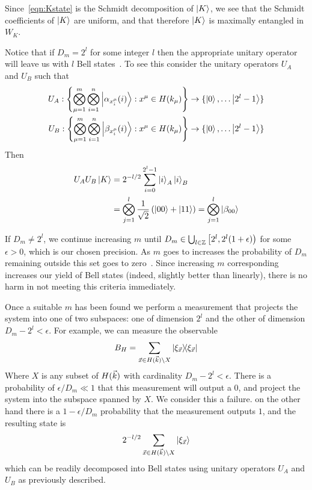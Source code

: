 Since~\eqref{eqn:Kstate} is the Schmidt decomposition of $\ket{K}$, we see that the Schmidt coefficients of $\ket{K}$ are uniform, and that therefore $\ket{K}$ is maximally entangled in $W_K$.

Notice that if $D_m = 2^l$ for some integer $l$ then the appropriate unitary operator will leave us with $l$ Bell states~\cite{bennett1996concentrating}. To see this consider the unitary operators $U_A$ and $U_B$ such that
\begin{align*}
U_A : \left\{
\bigotimes_{\mu=1}^m\bigotimes_{i=1}^n 
\ket{\alpha_{x_i^\mu}(i)}: x^\mu \in H(k_\mu) 
\right\} &\rightarrow \{\ket{0}, \ldots \ket{2^l-1
}\} \\
U_B :\left\{
\bigotimes_{\mu=1}^m\bigotimes_{i=1}^n 
\ket{\beta_{x_i^\mu}(i)}: x^\mu \in H(k_\mu) 
\right\} &\rightarrow \{\ket{0}, \ldots \ket{2^l-1
}\}
\end{align*}
Then
\begin{align*}
U_A U_B \ket{K} &= 2^{-l/2}\sum_{i=0}^{2^l-1} \ket{i}_A\ket{i}_B\\
&= \bigotimes_{j=1}^l \frac{1}{\sqrt{2}} \left(  \ket{00} + \ket{11} \right) =
\bigotimes_{j=1}^l \ket{\beta_{00}}
\end{align*}

If $D_m \neq 2^l$, we continue increasing $m$ until $D_m \in \bigcup_{l \in \mathbb{Z} }\left[2^l, 2^l(1+\epsilon)\right)$ for some $\epsilon > 0$, which is our chosen precision. As $m$ goes to increases the probability of $D_m$ remaining outside this set goes to zero~\cite{bennett1996concentrating}.
Since increasing $m$ corresponding increases our yield of Bell states (indeed, slightly better than linearly), there is no harm in not meeting this criteria immediately.

Once a suitable $m$ has been found we perform a measurement that projects the system into one of two subspaces: one of dimension $2^l$ and the other of dimension $D_m-2^l<\epsilon$. For example, we can measure the observable
$$
B_H = \sum_{\vx \in H(\vk) \setminus X} \dyad{ \xi_\vx }{ \xi_\vx } 
$$
Where $X$ is any subset of $H({\vec{k}})$ with cardinality $D_m - 2^l<\epsilon$.
There is a probability of $\epsilon / D_m \ll 1
$ that this measurement will output a $0$, and project the system into the subspace spanned by $X$. We consider this a failure. on the other hand there is a $1-\epsilon / D_m$ probability that the measurement outputs $1$, and the resulting state is
$$
2^{-l/2} \sum_{{\vec{x}} \in H({\vec{k}}) \setminus X} \ket{ \xi_{\vec{x}} }
$$
which can be readily decomposed into Bell states using unitary operators $U_A$ and $U_B$ as previously described.

